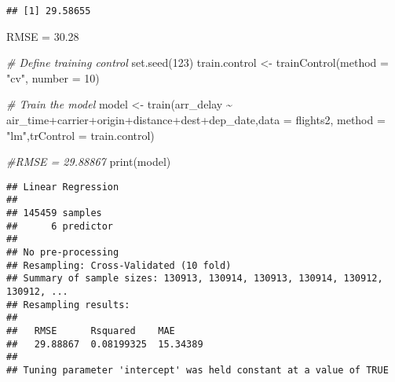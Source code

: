 \documentclass[
]{article}
\newenvironment{Shaded}{\begin{snugshade}}{\end{snugshade}}
\newcommand{\AttributeTok}[1]{\textcolor[rgb]{0.77,0.63,0.00}{#1}}
\newcommand{\CommentTok}[1]{\textcolor[rgb]{0.56,0.35,0.01}{\textit{#1}}}
\newcommand{\DecValTok}[1]{\textcolor[rgb]{0.00,0.00,0.81}{#1}}
\newcommand{\FunctionTok}[1]{\textcolor[rgb]{0.00,0.00,0.00}{#1}}
\newcommand{\NormalTok}[1]{#1}
\newcommand{\OtherTok}[1]{\textcolor[rgb]{0.56,0.35,0.01}{#1}}
\newcommand{\SpecialCharTok}[1]{\textcolor[rgb]{0.00,0.00,0.00}{#1}}
\newcommand{\StringTok}[1]{\textcolor[rgb]{0.31,0.60,0.02}{#1}}
\begin{document}
\begin{verbatim}
## [1] 29.58655
\end{verbatim}

RMSE = 30.28

\begin{Shaded}
\begin{Highlighting}[]
\CommentTok{\# Define training control}
\FunctionTok{set.seed}\NormalTok{(}\DecValTok{123}\NormalTok{) }
\NormalTok{train.control }\OtherTok{\textless{}{-}} \FunctionTok{trainControl}\NormalTok{(}\AttributeTok{method =} \StringTok{"cv"}\NormalTok{, }\AttributeTok{number =} \DecValTok{10}\NormalTok{)}

\CommentTok{\# Train the model}
\NormalTok{model }\OtherTok{\textless{}{-}} \FunctionTok{train}\NormalTok{(arr\_delay }\SpecialCharTok{\textasciitilde{}}\NormalTok{ air\_time}\SpecialCharTok{+}\NormalTok{carrier}\SpecialCharTok{+}\NormalTok{origin}\SpecialCharTok{+}\NormalTok{distance}\SpecialCharTok{+}\NormalTok{dest}\SpecialCharTok{+}\NormalTok{dep\_date,}\AttributeTok{data =}\NormalTok{ flights2, }\AttributeTok{method =} \StringTok{"lm"}\NormalTok{,}\AttributeTok{trControl =}\NormalTok{ train.control)}

\CommentTok{\#RMSE = 29.88867}
\FunctionTok{print}\NormalTok{(model)}
\end{Highlighting}
\end{Shaded}

\begin{verbatim}
## Linear Regression 
## 
## 145459 samples
##      6 predictor
## 
## No pre-processing
## Resampling: Cross-Validated (10 fold) 
## Summary of sample sizes: 130913, 130914, 130913, 130914, 130912, 130912, ... 
## Resampling results:
## 
##   RMSE      Rsquared    MAE     
##   29.88867  0.08199325  15.34389
## 
## Tuning parameter 'intercept' was held constant at a value of TRUE
\end{verbatim}
\end{document}
